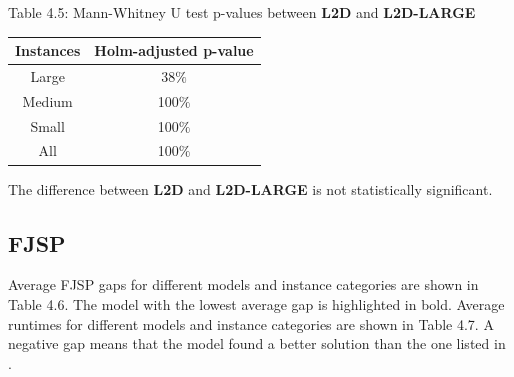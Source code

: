\begin{table}
    Table 4.5: Mann-Whitney U test p-values between \textbf{L2D} and \textbf{L2D-LARGE}\\
    \begin{tabular}{cc}
        \toprule
        Instances & Holm-adjusted p-value \\
        \midrule
        Large & 38$\%$ \\
        Medium & 100$\%$ \\
        Small & 100$\%$ \\
        All & 100$\%$ \\
        \bottomrule
        \end{tabular}
\end{table}

The difference between \textbf{L2D} and \textbf{L2D-LARGE} is not statistically significant.

\subsection{FJSP} \label{results_fjsp}

Average FJSP gaps for different models and instance categories are shown in Table 4.6. The model with the lowest average gap is highlighted in bold. Average runtimes for different models and instance categories are shown in Table 4.7. A negative gap means that the model found a better solution than the one listed in \cite{fjsp_benchmarks}.

